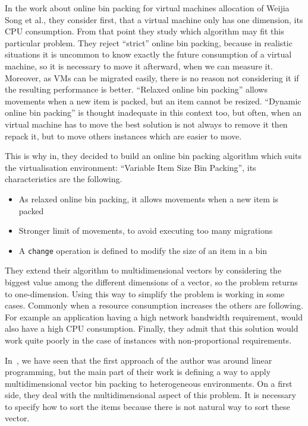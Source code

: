 \documentclass[a4paper,11pt]{article}
\begin{document}
In the work about online bin packing for virtual machines allocation of Weijia
Song et al.\cite{reassignment:visbp}, they consider first, that a virtual
machine only has one dimension, its CPU consumption. From that point they study
which algorithm may fit this particular problem. They reject “strict” online
bin packing, because in realistic situations it is uncommon to know exactly
the future consumption of a virtual machine, so it is necessary to move it
afterward, when we can measure it. Moreover, as VMs can be migrated easily,
there is no reason not considering it if the resulting performance is better.
“Relaxed online bin packing” allows movements when a new item is packed, but
an item cannot be resized. “Dynamic online bin packing” is thought inadequate
in this context too, but often, when an virtual machine has to move the best
solution is not always to remove it then repack it, but to move others instances
which are easier to move.

This is why in\cite{reassignment:visbp}, they decided to build an online bin
packing algorithm which suits the virtualisation environment: “Variable Item
Size Bin Packing”, its characteristics are the following.

\begin{itemize}
	\item{As relaxed online bin packing, it allows movements when a new item is packed}
	\item{Stronger limit of movements, to avoid executing too many migrations}
	\item{A \texttt{change} operation is defined to modify the size of an item in a bin}
\end{itemize}

They extend their algorithm to multidimensional vectors by considering the biggest
value among the different dimensions of a vector, so the problem returns to
one-dimension. Using this way to simplify the problem is working in some cases.
Commonly when a resource consumption increases the others are following. For
example an application having a high network bandwidth requirement, would also have a
high CPU consumption. Finally, they admit that this solution would work quite poorly
in the case of instances with non-proportional requirements.

In~\cite{allocation:heterogeneous}, we have seen that the first approach of the author
was around linear programming, but the main part of their work is defining a way
to apply multidimensional vector bin packing to heterogeneous environments. On a first side,
they deal with the multidimensional aspect of this problem. It is necessary to specify how to
sort the items because there is not natural way to sort these vector.
\end{document}
